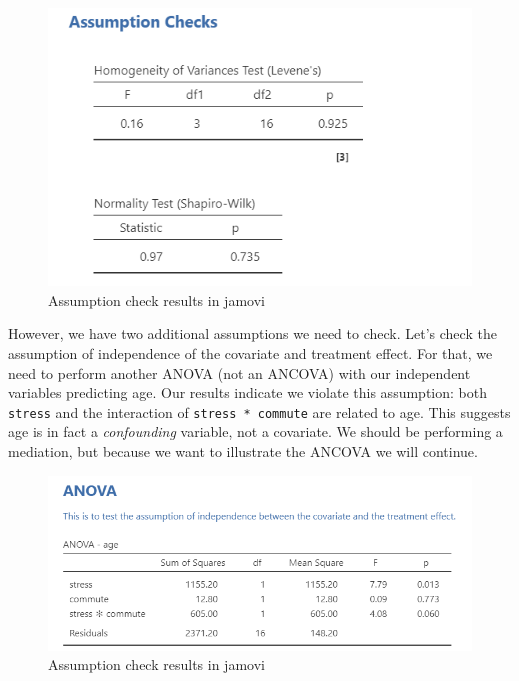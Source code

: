 \documentclass[
]{book}
\begin{document}
\begin{figure}

{\centering \includegraphics[width=1\linewidth]{images/07-ancova/ancova_assumptions} 

}

\caption{Assumption check results in jamovi}\label{fig:unnamed-chunk-1}
\end{figure}

However, we have two additional assumptions we need to check. Let's check the assumption of independence of the covariate and treatment effect. For that, we need to perform another ANOVA (not an ANCOVA) with our independent variables predicting age. Our results indicate we violate this assumption: both \texttt{stress} and the interaction of \texttt{stress\ *\ commute} are related to age. This suggests age is in fact a \emph{confounding} variable, not a covariate. We should be performing a mediation, but because we want to illustrate the ANCOVA we will continue.

\begin{figure}

{\centering \includegraphics[width=1\linewidth]{images/07-ancova/ancova_assumptions2} 

}

\caption{Assumption check results in jamovi}\label{fig:unnamed-chunk-2}
\end{figure}
\end{document}
